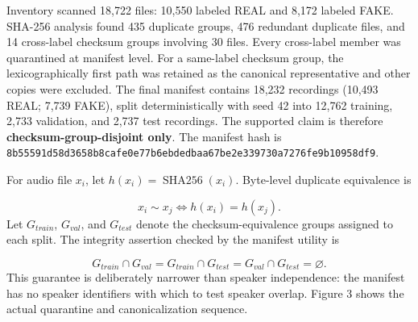 \documentclass[10pt,journal,onecolumn]{IEEEtran}
\begin{document}
Inventory scanned 18,722 files: 10,550 labeled REAL and 8,172 labeled FAKE. SHA-256 analysis found 435 duplicate groups, 476 redundant duplicate files, and 14 cross-label checksum groups involving 30 files. Every cross-label member was quarantined at manifest level. For a same-label checksum group, the lexicographically first path was retained as the canonical representative and other copies were excluded. The final manifest contains 18,232 recordings (10,493 REAL; 7,739 FAKE), split deterministically with seed 42 into 12,762 training, 2,733 validation, and 2,737 test recordings. The supported claim is therefore \textbf{checksum-group-disjoint only}. The manifest hash is \nolinkurl{8b55591d58d3658b8cafe0e77b6ebdedbaa67be2e339730a7276fe9b10958df9}.

For audio file $x_i$, let $h(x_i)=\operatorname{SHA256}(x_i)$. Byte-level duplicate equivalence is

\begin{equation}
x_i\sim x_j\iff h(x_i)=h(x_j).
\end{equation}
Let $G_{train}$, $G_{val}$, and $G_{test}$ denote the checksum-equivalence groups assigned to each split. The integrity assertion checked by the manifest utility is

\begin{equation}
G_{train}\cap G_{val}=G_{train}\cap G_{test}=G_{val}\cap G_{test}=\varnothing.
\end{equation}
This guarantee is deliberately narrower than speaker independence: the manifest has no speaker identifiers with which to test speaker overlap. Figure 3 shows the actual quarantine and canonicalization sequence.
\end{document}
